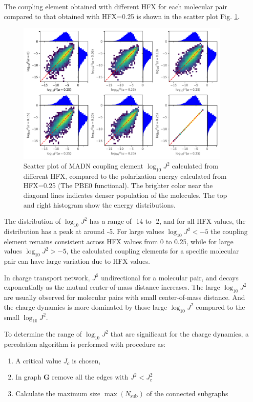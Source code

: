 \documentclass[letterpaper,12pt]{article}
\begin{document}
The coupling element obtained with different HFX for each molecular pair compared to that obtained with HFX=0.25 is shown in the scatter plot Fig. \ref{fig:J_MADN}.
\begin{figure}[H]
    \centering
    \includegraphics[width=0.95\textwidth]{figs/MADN_HFX/scatterJ_all.pdf}
    \caption{Scatter plot of MADN coupling element $\log_{10} J^2$ calculated from different HFX, compared to the polarization energy calculated from HFX=0.25 (The PBE0 functional). The brighter color near the diagonal lines indicates denser population of the molecules.  The top and right histogram show the energy distributions.}
    \label{fig:J_MADN}
\end{figure}

The distribution of $\log_{10} J^2$ has a range of -14 to -2, and for all HFX values, the distribution has a peak at around -5. 
For large values $\log_{10} J^2 < -5$ the coupling element remains consistent across HFX values from 0 to 0.25, while for large values $\log_{10} J^2 > -5$, the calculated coupling elements for a specific molecular pair can have large variation due to HFX values. 

In charge transport network, $J^2$ undirectional for a molecular pair, and decays exponentially as the mutual center-of-mass distance increases. The large $\log_{10} J^2$ are usually observed for molecular pairs with small center-of-mass distance. And the charge dynamics is more dominated by those large $\log_{10} J^2$ compared to the small $\log_{10} J^2$. 

To determine the range of $\log_{10} J^2$ that are significant for the charge dynamics, a percolation algorithm is performed with procedure as:
\begin{enumerate}
    \item A critical value $J_c$ is chosen,
    \item In graph $\mathbf{G}$ remove all the edges with $J^2 < J_c^2$
    \item Calculate the maximum size $\max({N_\text{sub}})$ of the connected subgraphs
\end{enumerate}
\end{document}
